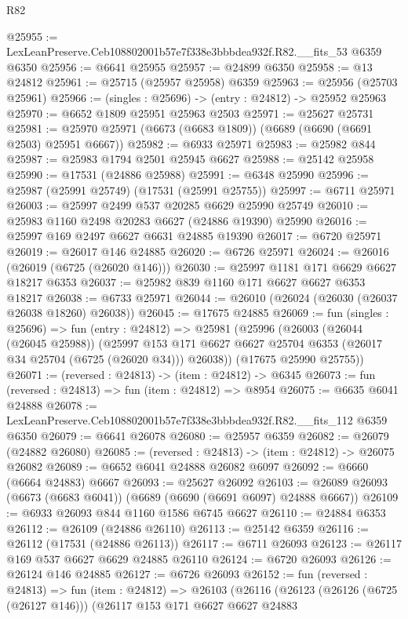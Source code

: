 \begin{lexlean}{R82}
\begin{coremodule}
@25955 := LexLeanPreserve.Ceb108802001b57e7f338e3bbbdea932f.R82.__fits_53 @6359 @6350
@25956 := @6641 @25955
@25957 := @24899 @6350
@25958 := @13 @24812
@25961 := @25715 (@25957 @25958) @6359
@25963 := @25956 (@25703 @25961)
@25966 := (singles : @25696) -> (entry : @24812) -> @25952 @25963
@25970 := @6652 @1809 @25951 @25963 @2503
@25971 := @25627 @25731
@25981 := @25970 @25971 (@6673 (@6683 @1809)) (@6689 (@6690 (@6691 @2503) @25951 @6667))
@25982 := @6933 @25971
@25983 := @25982 @844
@25987 := @25983 @1794 @2501 @25945 @6627
@25988 := @25142 @25958
@25990 := @17531 (@24886 @25988)
@25991 := @6348 @25990
@25996 := @25987 (@25991 @25749) (@17531 (@25991 @25755))
@25997 := @6711 @25971
@26003 := @25997 @2499 @537 @20285 @6629 @25990 @25749
@26010 := @25983 @1160 @2498 @20283 @6627 (@24886 @19390) @25990
@26016 := @25997 @169 @2497 @6627 @6631 @24885 @19390
@26017 := @6720 @25971
@26019 := @26017 @146 @24885
@26020 := @6726 @25971
@26024 := @26016 (@26019 (@6725 (@26020 @146)))
@26030 := @25997 @1181 @171 @6629 @6627 @18217 @6353
@26037 := @25982 @839 @1160 @171 @6627 @6627 @6353 @18217
@26038 := @6733 @25971
@26044 := @26010 (@26024 (@26030 (@26037 @26038 @18260) @26038))
@26045 := @17675 @24885
@26069 := fun (singles : @25696) =>
  fun (entry : @24812) =>
  @25981
    (@25996
      (@26003
        (@26044 (@26045 @25988))
        (@25997 @153 @171 @6627 @6627 @25704 @6353 (@26017 @34 @25704 (@6725 (@26020 @34))) @26038))
      (@17675 @25990 @25755))
@26071 := (reversed : @24813) -> (item : @24812) -> @6345
@26073 := fun (reversed : @24813) => fun (item : @24812) => @8954
@26075 := @6635 @6041 @24888
@26078 := LexLeanPreserve.Ceb108802001b57e7f338e3bbbdea932f.R82.__fits_112 @6359 @6350
@26079 := @6641 @26078
@26080 := @25957 @6359
@26082 := @26079 (@24882 @26080)
@26085 := (reversed : @24813) -> (item : @24812) -> @26075 @26082
@26089 := @6652 @6041 @24888 @26082 @6097
@26092 := @6660 (@6664 @24883) @6667
@26093 := @25627 @26092
@26103 := @26089 @26093 (@6673 (@6683 @6041)) (@6689 (@6690 (@6691 @6097) @24888 @6667))
@26109 := @6933 @26093 @844 @1160 @1586 @6745 @6627
@26110 := @24884 @6353
@26112 := @26109 (@24886 @26110)
@26113 := @25142 @6359
@26116 := @26112 (@17531 (@24886 @26113))
@26117 := @6711 @26093
@26123 := @26117 @169 @537 @6627 @6629 @24885 @26110
@26124 := @6720 @26093
@26126 := @26124 @146 @24885
@26127 := @6726 @26093
@26152 := fun (reversed : @24813) =>
  fun (item : @24812) =>
  @26103
    (@26116
      (@26123
        (@26126 (@6725 (@26127 @146)))
        (@26117
          @153
          @171
          @6627
          @6627
          @24883

\end{coremodule}
\end{lexlean}
